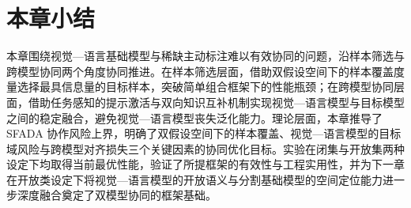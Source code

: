 

\FloatBarrier
\section{本章小结}

本章围绕视觉—语言基础模型与稀缺主动标注难以有效协同的问题，沿样本筛选与跨模型协同两个角度协同推进。在样本筛选层面，借助双假设空间下的样本覆盖度量选择最具信息量的目标样本，突破简单组合框架下的性能瓶颈；在跨模型协同层面，借助任务感知的提示激活与双向知识互补机制实现视觉—语言模型与目标模型之间的稳定融合，避免视觉—语言模型丧失泛化能力。理论层面，本章推导了 SFADA 协作风险上界，明确了双假设空间下的样本覆盖、视觉—语言模型的目标域风险与跨模型对齐损失三个关键因素的协同优化目标。实验在闭集与开放集两种设定下均取得当前最优性能，验证了所提框架的有效性与工程实用性，并为下一章在开放类设定下将视觉—语言模型的开放语义与分割基础模型的空间定位能力进一步深度融合奠定了双模型协同的框架基础。


